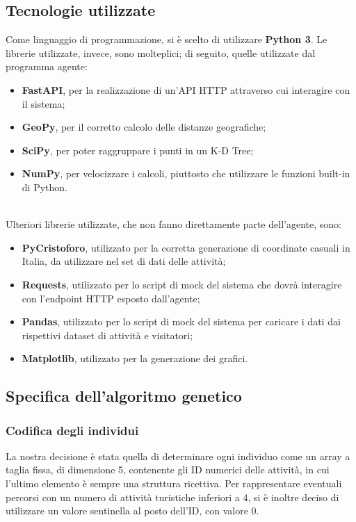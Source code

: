 \documentclass{CSUniSchoolLabReport}
\begin{document}
\subsection{Tecnologie utilizzate}

Come linguaggio di programmazione, si è scelto di utilizzare \textbf{Python 3}.
Le librerie utilizzate, invece, sono molteplici; di seguito, quelle utilizzate dal programma agente:

\begin{itemize}
	\item \textbf{FastAPI}, per la realizzazione di un'API HTTP attraverso cui interagire con il sistema;
	\item \textbf{GeoPy}, per il corretto calcolo delle distanze geografiche;
	\item \textbf{SciPy}, per poter raggruppare i punti in un K-D Tree;
	\item \textbf{NumPy}, per velocizzare i calcoli, piuttosto che utilizzare le funzioni built-in di Python.
\end{itemize}

$ $\\
Ulteriori librerie utilizzate, che non fanno direttamente parte dell'agente, sono:
\begin{itemize}
	\item \textbf{PyCristoforo}, utilizzato per la corretta generazione di coordinate casuali in Italia, da utilizzare nel set di dati delle attività;
	\item \textbf{Requests}, utilizzato per lo script di mock del sistema che dovrà interagire con l'endpoint HTTP esposto dall'agente;
	\item \textbf{Pandas}, utilizzato per lo script di mock del sistema per caricare i dati dai rispettivi dataset di attività e visitatori;
	\item \textbf{Matplotlib}, utilizzato per la generazione dei grafici.
\end{itemize}

\pagebreak{}
\subsection{Specifica dell'algoritmo genetico}

\subsubsection{Codifica degli individui}

La nostra decisione è stata quella di determinare ogni individuo come un array a taglia fissa, di dimensione 5, contenente gli ID numerici delle attività, in cui l'ultimo elemento è sempre una struttura ricettiva. Per rappresentare eventuali percorsi con un numero di attività turistiche inferiori a 4, si è inoltre deciso di utilizzare un valore sentinella al posto dell'ID, con valore 0.
\end{document}
